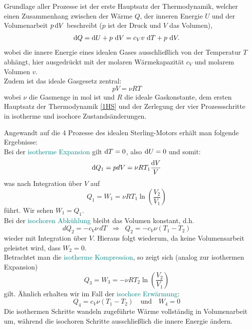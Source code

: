 Grundlage aller Prozesse ist der erste Hauptsatz der Thermodynamik, welcher einen Zusammenhang zwischen der Wärme \(Q\), der inneren Energie \(U\) und der Volumenarbeit \(p\mathop{}\!\mathrm{d} V\) beschreibt (\(p\) ist der Druck und \(V\) das Volumen),
\begin{equation}
    \label{1HS}
    \mathop{}\!\mathrm{d} Q = \mathop{}\!\mathrm{d} U + p\,\mathop{}\!\mathrm{d} V = c_V v\, \mathop{}\!\mathrm{d} T + p\, \mathop{}\!\mathrm{d} V .
\end{equation}
wobei die innere Energie eines idealen Gases ausschließlich von der Temperatur \(T\) abhängt, hier ausgedrückt mit der molaren Wärmekapazität \(c_V\) und molarem Volumen \(v\).\\ 
Zudem ist das ideale Gasgesetz zentral:
\begin{equation}
    \label{Gas}
    pV = \nu RT 
\end{equation}
wobei \(\nu\) die Gasmenge in mol ist und \(R\) die ideale Gaskonstante, dem ersten Hauptsatz der Thermodynamik \eqref{1HS} und der Zerlegung der vier Prozessschritte in isotherme und isochore Zustandsänderungen.

Angewandt auf die 4 Prozesse des idealen Sterling-Motors erhält man folgende Ergebnisse:\\ Bei der \textcolor{teal}{isotherme Expansion} gilt \(\mathop{}\!\mathrm{d} T = 0\), also \(\mathop{}\!\mathrm{d} U = 0\) und somit:
\begin{equation}
    \mathop{}\!\mathrm{d} Q_1 = pdV = \nu RT_1 \frac{\mathop{}\!\mathrm{d} V}{V}
\end{equation}
was nach Integration über \(V\) auf
\begin{equation}
    Q_1 = W_1 = \nu RT_1 \ln \left( \frac{V_2}{V_1} \right)
\end{equation}
führt. Wir sehen \(W_1 = Q_1\).\\
Bei der \textcolor{teal}{isochoren Abkühlung} bleibt das Volumen konstant, d.h.
\begin{equation}
dQ_2 = -c_V \nu \, dT \;\;\Rightarrow\;\; Q_2 = -c_V \nu (T_1 - T_2)
\end{equation}
wieder mit Integration über \(V\). Hieraus folgt wiederum, da keine Volumensarbeit geleistet wird, dass \(W_2 = 0\).\\
Betrachtet man die \textcolor{teal}{\textcolor{teal}{isotherme Kompression}}, so zeigt sich (analog zur isothermen Expansion)
\begin{equation}
Q_3 = W_3 = -\nu R T_2 \ln\left(\frac{V_2}{V_1}\right)
\end{equation}
gilt. Ähnlich erhalten wir im Fall der \textcolor{teal}{isochore Erwärmung}:
\begin{equation}
Q_4 = c_V \nu (T_1 - T_2) \quad \text{und} \quad W_4 = 0
\end{equation}
Die isothermen Schritte wandeln zugeführte Wärme vollständig in Volumenarbeit um, während die isochoren Schritte ausschließlich die innere Energie ändern.
